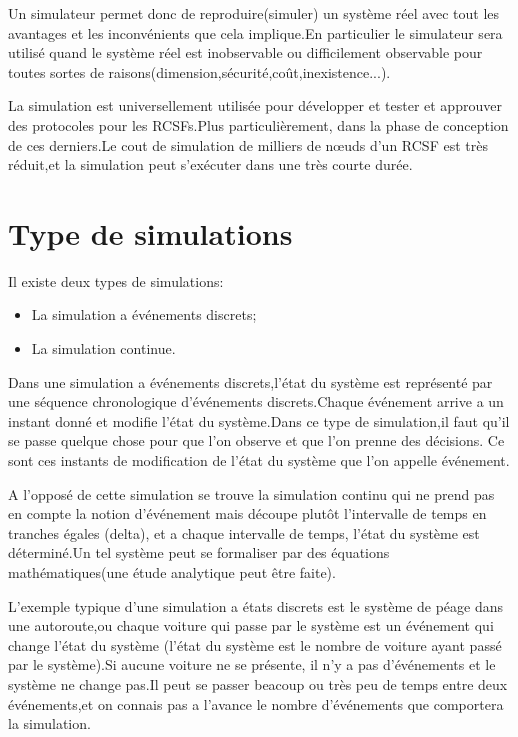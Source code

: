 Un simulateur permet donc de reproduire(simuler) un système réel avec tout les avantages et les inconvénients que cela implique.En particulier le simulateur sera utilisé quand le système réel est inobservable ou difficilement observable pour toutes sortes de raisons(dimension,sécurité,coût,inexistence...).

La simulation est universellement utilisée pour développer et tester et approuver des protocoles pour les RCSFs.Plus particulièrement,  dans la phase de conception de ces derniers.Le cout de simulation de milliers de nœuds d'un RCSF est très réduit,et la simulation peut s'exécuter dans une très courte durée.

\section{Type de simulations}
Il existe deux types de simulations:
\begin{itemize}
\item La simulation a événements discrets;
\item La simulation continue.
\end{itemize}

Dans une simulation a événements discrets,l'état du système est représenté par une séquence chronologique d'événements discrets.Chaque événement arrive a un instant donné et modifie l'état du système.Dans ce type de simulation,il faut qu'il se passe quelque chose pour que l'on observe et que l’on prenne des décisions. Ce sont ces instants de modification de l’état du système que l’on appelle événement.

A l'opposé de cette simulation se trouve la simulation continu qui ne prend pas en compte la notion d'événement mais découpe plutôt l'intervalle de temps en tranches égales (delta),
et a chaque intervalle de temps, l'état du système est déterminé.Un tel système peut se formaliser par des équations mathématiques(une étude analytique peut être faite).

L'exemple typique d'une simulation a  états discrets est le système de péage dans une autoroute,ou chaque voiture qui passe par le système est un événement qui change l'état du système (l'état du système est le nombre de voiture ayant passé par le système).Si aucune voiture ne se présente, il n'y a pas d'événements et le système ne change pas.Il peut se passer beacoup ou très peu de temps entre deux événements,et on connais pas a l'avance le nombre d'événements que comportera la simulation. 

